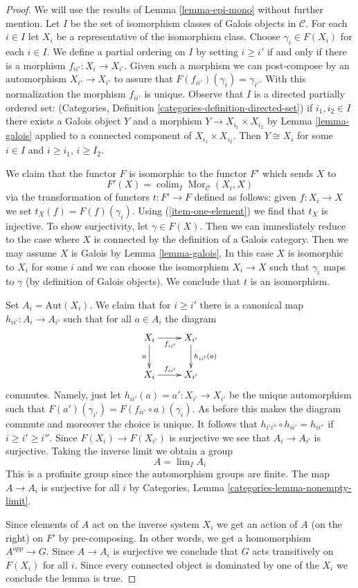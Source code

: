 \documentclass{stacks-project}
\theoremstyle{plain}
\theoremstyle{definition}
\theoremstyle{remark}
\numberwithin{equation}{subsection}
\def\lim{\mathop{\mathrm{lim}}\nolimits}
\def\colim{\mathop{\mathrm{colim}}\nolimits}
\def\Mor{\mathop{\mathrm{Mor}}\nolimits}
\begin{document}
\begin{proof}
We will use the results of Lemma \ref{lemma-epi-mono} without further mention.
Let $I$ be the set of isomorphism classes of Galois objects in $\mathcal{C}$.
For each $i \in I$ let $X_i$ be a representative of the isomorphism class.
Choose $\gamma_i \in F(X_i)$ for each $i \in I$.
We define a partial ordering on $I$ by setting $i \geq i'$ if
and only if there is a morphism $f_{ii'} : X_i \to X_{i'}$.
Given such a morphism we can post-compose by an automorphism
$X_{i'} \to X_{i'}$ to assure that $F(f_{ii'})(\gamma_i) = \gamma_{i'}$.
With this normalization the morphism $f_{ii'}$ is unique.
Observe that $I$ is a directed partially ordered set:
(Categories, Definition \ref{categories-definition-directed-set})
if $i_1, i_2 \in I$ there exists a Galois object $Y$ and a morphism
$Y \to X_{i_1} \times X_{i_2}$ by Lemma \ref{lemma-galois} applied
to a connected component of $X_{i_1} \times X_{i_2}$.
Then $Y \cong X_i$ for some $i \in I$ and $i \geq i_1$, $i \geq I_2$.

\medskip\noindent
We claim that the functor $F$ is isomorphic to the functor $F'$
which sends $X$ to
$$
F'(X) = \colim_I \Mor_\mathcal{C}(X_i, X)
$$
via the transformation of functors $t : F' \to F$ defined as follows:
given $f : X_i \to X$ we set $t_X(f) = F(f)(\gamma_i)$.
Using (\ref{item-one-element}) we find that $t_X$ is injective.
To show surjectivity, let $\gamma \in F(X)$. Then we can immediately
reduce to the case where $X$ is connected by the definition of
a Galois category. Then we may assume $X$ is Galois by
Lemma \ref{lemma-galois}. In this case $X$ is isomorphic to $X_i$
for some $i$ and we can choose the isomorphism $X_i \to X$ such
that $\gamma_i$ maps to $\gamma$ (by definition of Galois objects).
We conclude that $t$ is an isomorphism.

\medskip\noindent
Set $A_i = \text{Aut}(X_i)$.
We claim that for $i \geq i'$ there is a canonical map
$h_{ii'} : A_i \to A_{i'}$ such that for all $a \in A_i$
the diagram
$$
\xymatrix{
X_i \ar[d]_a \ar[r]_{f_{ii'}} & X_{i'} \ar[d]^{h_{ii'}(a)} \\
X_i \ar[r]^{f_{ii'}} & X_{i'}
}
$$
commutes. Namely, just let $h_{ii'}(a) = a' : X_{i'} \to X_{i'}$
be the unique automorphism such that
$F(a')(\gamma_{i'}) = F(f_{ii'} \circ a)(\gamma_i)$.
As before this makes the diagram commute and moreover the choice
is unique.
It follows that
$h_{i'i''} \circ h_{ii'} = h_{ii''}$
if $i \geq i' \geq i''$.
Since $F(X_i) \to F(X_{i'})$ is surjective we see that
$A_i \to A_{i'}$ is surjective.
Taking the inverse limit we obtain a group
$$
A = \lim_I A_i
$$
This is a profinite group since the automorphism groups are finite.
The map $A \to A_i$ is surjective for all $i$ by
Categories, Lemma \ref{categories-lemma-nonempty-limit}.

\medskip\noindent
Since elements of $A$ act on the inverse system $X_i$ we get an action of
$A$ (on the right) on $F'$ by pre-composing. In other words, we get
a homomorphism $A^{opp} \to G$. Since $A \to A_i$ is surjective we conclude
that $G$ acts transitively on $F(X_i)$ for all $i$. Since every connected
object is dominated by one of the $X_i$ we conclude the lemma is true.
\end{proof}
\end{document}
